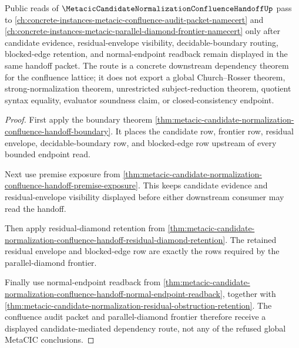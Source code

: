 \begin{theorem}
\label{thm:metacic-candidate-normalization-orphan-route}
Public reads of $\MetacicCandidateNormalizationConfluenceHandoffUp$ pass to \autoref{ch:concrete-instances-metacic-confluence-audit-packet-namecert} and \autoref{ch:concrete-instances-metacic-parallel-diamond-frontier-namecert} only after candidate evidence, residual-envelope visibility, decidable-boundary routing, blocked-edge retention, and normal-endpoint readback remain displayed in the same handoff packet. The route is a concrete downstream dependency theorem for the confluence lattice; it does not export a global Church--Rosser theorem, strong-normalization theorem, unrestricted subject-reduction theorem, quotient syntax equality, evaluator soundness claim, or closed-consistency endpoint.
\end{theorem}
\begin{proof}
First apply the boundary theorem \autoref{thm:metacic-candidate-normalization-confluence-handoff-boundary}. It places the candidate row, frontier row, residual envelope, decidable-boundary row, and blocked-edge row upstream of every bounded endpoint read.

Next use premise exposure from \autoref{thm:metacic-candidate-normalization-confluence-handoff-premise-exposure}. This keeps candidate evidence and residual-envelope visibility displayed before either downstream consumer may read the handoff.

Then apply residual-diamond retention from \autoref{thm:metacic-candidate-normalization-confluence-handoff-residual-diamond-retention}. The retained residual envelope and blocked-edge row are exactly the rows required by the parallel-diamond frontier.

Finally use normal-endpoint readback from \autoref{thm:metacic-candidate-normalization-confluence-handoff-normal-endpoint-readback}, together with \autoref{thm:metacic-candidate-normalization-residual-obstruction-retention}. The confluence audit packet and parallel-diamond frontier therefore receive a displayed candidate-mediated dependency route, not any of the refused global MetaCIC conclusions.
\end{proof}
